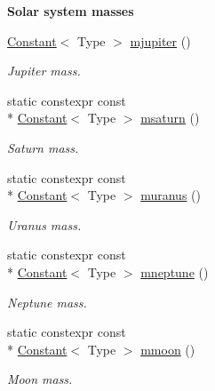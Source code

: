 \begin{Indent}{\bf Solar system masses}
\begin{DoxyCompactItemize}
\hyperlink{exceptionmagrathea_1_1Constant}{Constant}$<$ Type $>$ \hyperlink{exceptionmagrathea_1_1Constants_a0d1b1c064c203cd9ba0c1213410d843f}{mjupiter} ()
\begin{DoxyCompactList}\small\item\em Jupiter mass. \end{DoxyCompactList}\item 
static constexpr const \\*
\hyperlink{exceptionmagrathea_1_1Constant}{Constant}$<$ Type $>$ \hyperlink{exceptionmagrathea_1_1Constants_a5c12ed46e946b67154a7d15e86a29f7e}{msaturn} ()
\begin{DoxyCompactList}\small\item\em Saturn mass. \end{DoxyCompactList}\item 
static constexpr const \\*
\hyperlink{exceptionmagrathea_1_1Constant}{Constant}$<$ Type $>$ \hyperlink{exceptionmagrathea_1_1Constants_a06d838a6980bdbae7659612860dfedcf}{muranus} ()
\begin{DoxyCompactList}\small\item\em Uranus mass. \end{DoxyCompactList}\item 
static constexpr const \\*
\hyperlink{exceptionmagrathea_1_1Constant}{Constant}$<$ Type $>$ \hyperlink{exceptionmagrathea_1_1Constants_a13488d534c6a25037ae7fd6bd6f53070}{mneptune} ()
\begin{DoxyCompactList}\small\item\em Neptune mass. \end{DoxyCompactList}\item 
static constexpr const \\*
\hyperlink{exceptionmagrathea_1_1Constant}{Constant}$<$ Type $>$ \hyperlink{exceptionmagrathea_1_1Constants_a621db4e21f4c2b068fa33c59cb2f1b25}{mmoon} ()
\begin{DoxyCompactList}\small\item\em Moon mass. \end{DoxyCompactList}\end{DoxyCompactItemize}
\end{Indent}
